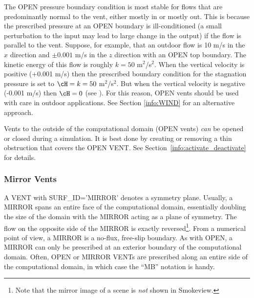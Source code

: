 \documentclass[11pt]{book}
\begin{document}
The {\ct OPEN} pressure boundary condition is most stable for flows that are predominantly normal  to the vent, either mostly in or mostly out.  This is because the prescribed pressure at an {\ct OPEN} boundary is ill-conditioned (a small perturbation to the input may lead to large change in the output) if the flow is parallel to the vent.  Suppose, for example, that an outdoor flow is 10 m/s in the $x$ direction and $\pm 0.001$ m/s in the $z$ direction with an {\ct OPEN} top boundary.  The kinetic energy of this flow is roughly $k=50$ m$^2$/s$^2$.  When the vertical velocity is positive (+0.001 m/s) then the prescribed boundary condition for the stagnation pressure is set to $\cH = k = 50$ m$^2$/s$^2$.  But when the vertical velocity is negative (-0.001 m/s) then $\cH = 0$ (see \cite{FDS_Tech_Guide}).  For this reason, {\ct OPEN} vents should be used with care in outdoor applications.  See Section \ref{info:WIND} for an alternative approach.


Vents to the outside of the computational domain ({\ct OPEN} vents)
{\em  can} be opened or closed during a simulation. It is best done by creating or removing a thin obstruction that covers the {\ct OPEN VENT}.
See Section~\ref{info:activate_deactivate} for details.


\subsubsection{Mirror Vents}

A {\ct VENT} with {\ct SURF\_ID='MIRROR'} denotes a symmetry plane. Usually, a {\ct MIRROR} spans an entire face of the computational domain, essentially doubling the size of the domain with the {\ct MIRROR} acting as a plane of symmetry. The flow on the opposite side of the {\ct MIRROR} is exactly reversed\footnote{Note that the mirror image of a scene is {\em not} shown in Smokeview.}. From a numerical point of view, a {\ct MIRROR} is a no-flux, free-slip boundary. As with {\ct OPEN}, a {\ct MIRROR} can only be prescribed at an exterior boundary of the computational domain. Often, {\ct OPEN} or {\ct MIRROR} {\ct VENT}s are prescribed along an entire side of the computational domain, in which case the ``{\ct MB}'' notation is handy.
\end{document}
